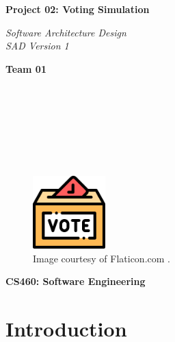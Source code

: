 \documentclass{article}
\begin{document}
\begin{titlepage}
\begin{center}
\vspace*{1cm}

\Huge
\textbf{Project 02: Voting Simulation}

\vspace{0.5cm}
\Large
\textit{Software Architecture Design} \\
\textit{SAD Version 1}

\vspace{1cm}

\textbf{Team 01}

\vspace{0.5cm}

 \\
 \\
 \\
 \\
 \\
 \\

\vspace{1cm}

\begin{figure}[h]
    \centering
    \includegraphics[width=0.25\textwidth]{docs/sad/figures/ballot_icon.png}
    \caption*{Image courtesy of Flaticon.com \cite{flaticonElectionsFree}.}
    \label{fig:safeIcon}
\end{figure}

\vspace{7cm}

\Large
\textbf{CS460: Software Engineering} \\

\end{center}
\end{titlepage}

\newpage

\tableofcontents

\newpage

\section{Introduction}
\end{document}
